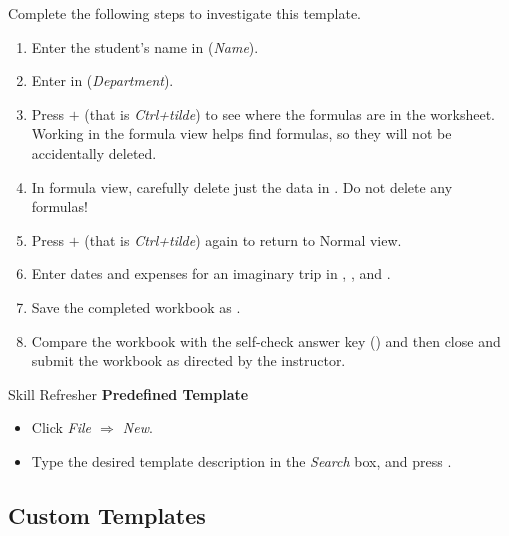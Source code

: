 Complete the following steps to investigate this template.

\begin{enumerate}
	\item Enter the student's name in  (\textit{Name}).
	\item Enter  in  (\textit{Department}).
	\item Press $+$\fmtKeystroke{$ \sim $} (that is \textit{Ctrl+tilde}) to see where the formulas are in the worksheet. Working in the formula view helps find formulas, so they will not be accidentally deleted.
	\item In formula view, carefully delete just the data in . Do not delete any formulas!
	\item Press $+$\fmtKeystroke{$ \sim $} (that is \textit{Ctrl+tilde}) again to return to Normal view.
	\item Enter dates and expenses for an imaginary trip in , , and .
	\item Save the completed workbook as .
	\item Compare the workbook with the self-check answer key () and then close and submit the  workbook as directed by the instructor.
\end{enumerate}

\begin{center}
	\begin{sklbox}{Skill Refresher}
		\textbf{Predefined Template}
		\\
		\begin{itemize}
			\setlength{\itemsep}{0pt}
			\setlength{\parskip}{0pt}
			\setlength{\parsep}{0pt}

			\item Click \textit{File $ \Rightarrow $ New}.
			\item Type the desired template description in the \textit{Search} box, and press .
			
		\end{itemize}
	\end{sklbox}
\end{center}

\subsection{Custom Templates}

